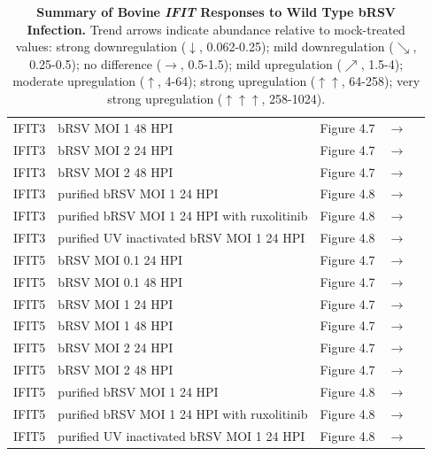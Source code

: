 \begin{table}
\begin{tabular}{lllll}
        IFIT3 & bRSV MOI 1 48 HPI & Figure 4.7 & \(\rightarrow\) \\ 
        IFIT3 & bRSV MOI 2 24 HPI & Figure 4.7 & \(\rightarrow\) \\ 
        IFIT3 & bRSV MOI 2 48 HPI & Figure 4.7 & \(\rightarrow\) \\ 
        IFIT3 & purified bRSV MOI 1 24 HPI & Figure 4.8 & \(\rightarrow\) \\ 
        IFIT3 & purified bRSV MOI 1 24 HPI with ruxolitinib & Figure 4.8 & \(\rightarrow\) \\ 
        IFIT3 & purified UV inactivated bRSV MOI 1 24 HPI & Figure 4.8 & \(\rightarrow\) \\ 
        IFIT5 & bRSV MOI 0.1 24 HPI & Figure 4.7 & \(\rightarrow\) \\ 
        IFIT5 & bRSV MOI 0.1 48 HPI & Figure 4.7 & \(\rightarrow\) \\ 
        IFIT5 & bRSV MOI 1 24 HPI & Figure 4.7 & \(\rightarrow\) \\ 
        IFIT5 & bRSV MOI 1 48 HPI & Figure 4.7 & \(\rightarrow\) \\ 
        IFIT5 & bRSV MOI 2 24 HPI & Figure 4.7 & \(\rightarrow\) \\ 
        IFIT5 & bRSV MOI 2 48 HPI & Figure 4.7 & \(\rightarrow\) \\ 
        IFIT5 & purified bRSV MOI 1 24 HPI & Figure 4.8 & \(\rightarrow\) \\ 
        IFIT5 & purified bRSV MOI 1 24 HPI with ruxolitinib & Figure 4.8 & \(\rightarrow\) \\ 
        IFIT5 & purified UV inactivated bRSV MOI 1 24 HPI & Figure 4.8 & \(\rightarrow\) \\ \hline
    \end{tabular}
	\caption[Summary of Bovine \textit{IFIT} Responses to Wild Type bRSV Infection.]{\textbf{Summary of Bovine \textit{IFIT} Responses to Wild Type bRSV Infection.} Trend arrows indicate abundance relative to mock-treated values: strong downregulation ($\downarrow$, 0.062-0.25); mild downregulation ($\searrow$, 0.25-0.5); no difference ($\rightarrow$, 0.5-1.5); mild upregulation ($\nearrow$, 1.5-4); moderate upregulation ($\uparrow$, 4-64); strong upregulation ($\uparrow\uparrow$, 64-258); very strong upregulation ($\uparrow\uparrow\uparrow$, 258-1024).}
    \label{tab:Summary of Bovine IFIT Responses to Wild Type bRSV Infection.}
\end{table}

